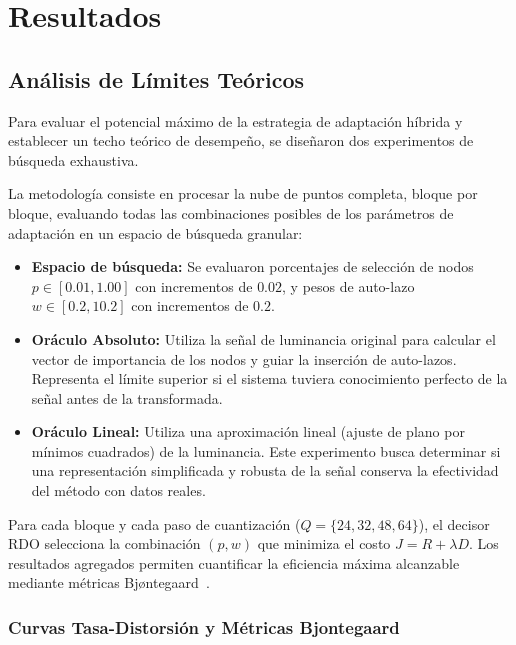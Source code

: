 \chapter{Resultados}

\section{Análisis de Límites Teóricos}
\label{sec:oracle_upper_bounds}

Para evaluar el potencial máximo de la estrategia de adaptación híbrida y establecer un techo teórico de desempeño, se diseñaron dos experimentos de búsqueda exhaustiva.

La metodología consiste en procesar la nube de puntos completa, bloque por bloque, evaluando todas las combinaciones posibles de los parámetros de adaptación en un espacio de búsqueda granular:

\begin{itemize}
    \item \textbf{Espacio de búsqueda:} Se evaluaron porcentajes de selección de nodos $p \in [0.01, 1.00]$ con incrementos de $0.02$, y pesos de auto-lazo $w \in [0.2, 10.2]$ con incrementos de $0.2$.
    \item \textbf{Oráculo Absoluto:} Utiliza la señal de luminancia original para calcular el vector de importancia de los nodos y guiar la inserción de auto-lazos. Representa el límite superior si el sistema tuviera conocimiento perfecto de la señal antes de la transformada.
    \item \textbf{Oráculo Lineal:} Utiliza una aproximación lineal (ajuste de plano por mínimos cuadrados) de la luminancia. Este experimento busca determinar si una representación simplificada y robusta de la señal conserva la efectividad del método con datos reales.
\end{itemize}

Para cada bloque y cada paso de cuantización ($Q=\{24, 32, 48, 64\}$), el decisor RDO selecciona la combinación $(p, w)$ que minimiza el costo $J = R + \lambda D$. Los resultados agregados permiten cuantificar la eficiencia máxima alcanzable mediante métricas Bjøntegaard~\cite{bjontegaard2001calculation}.

\subsection{Curvas Tasa-Distorsión y Métricas Bjontegaard}
\label{sec:oracle_real_rd}

